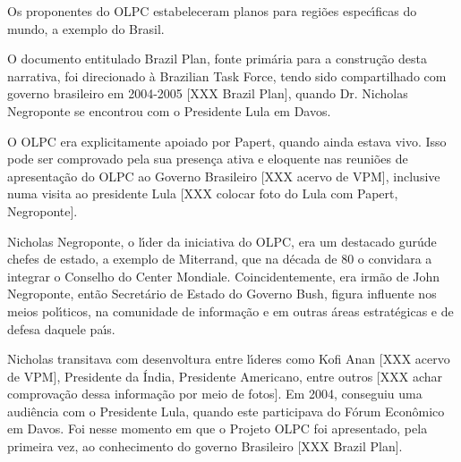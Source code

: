 \documentclass[
12pt,		%
openright,	%
twoside,  %
a4paper,			%
chapter=TITLE,		%
english,			%
french,				%
spanish,			%
brazil				%
]{USPSC-classe/USPSC}
\begin{document}
Os proponentes do OLPC estabeleceram planos para regi\~oes espec\'{\i}ficas do mundo, a exemplo do Brasil.














O documento entitulado \textquotedbl Brazil Plan\textquotedbl , fonte prim\'aria para a constru\c{c}\~ao desta narrativa, foi direcionado \`a \textquotedbl Brazilian Task Force\textquotedbl , tendo sido compartilhado com governo brasileiro em 2004-2005 [XXX Brazil Plan], quando Dr. Nicholas Negroponte se encontrou com o Presidente Lula em Davos.














O OLPC era explicitamente apoiado por Papert, quando ainda estava vivo. Isso pode ser comprovado pela sua presen\c{c}a ativa e eloquente nas reuni\~oes de apresenta\c{c}\~ao do OLPC ao Governo Brasileiro [XXX acervo de VPM], inclusive numa visita ao presidente Lula [XXX colocar foto do Lula com Papert, Negroponte].














Nicholas Negroponte, o l\'{\i}der da iniciativa do OLPC, era um destacado \textquotedbl gur\'u\textquotedbl  de chefes de estado, a exemplo de Miterrand, que na d\'ecada de 80 o convidara a integrar o Conselho do \textquotedbl Center Mondiale. Coincidentemente, era irm\~ao de John Negroponte, ent\~ao Secret\'ario de Estado do Governo Bush, figura influente nos meios pol\'{\i}ticos, na comunidade de informa\c{c}\~ao e em outras \'areas estrat\'egicas e de defesa daquele pa\'{\i}s.














Nicholas transitava com desenvoltura entre l\'{\i}deres como Kofi Anan [XXX acervo de VPM], Presidente da \'India, Presidente Americano, entre outros [XXX achar comprova\c{c}\~ao dessa informa\c{c}\~ao por meio de fotos]. Em 2004, conseguiu uma audi\^encia com o Presidente Lula, quando este participava do F\'orum  Econ\^omico  em Davos. Foi nesse momento em que o Projeto OLPC foi apresentado, pela primeira vez, ao conhecimento do governo Brasileiro [XXX Brazil Plan].
\end{document}

